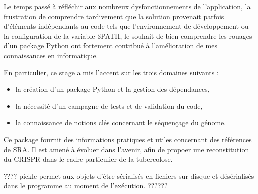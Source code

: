 \documentclass[twoside,a4paper,11pt,frenchb,openany]{report}
\begin{document}
Le temps passé à réfléchir aux nombreux dysfonctionnements de l'application, la frustration de comprendre tardivement que la solution provenait parfois d'éléments indépendants au code tels que l'environnement de développement ou la configuration de la variable \$PATH, le souhait de bien comprendre les rouages d'un package Python ont fortement contribué à l'amélioration de mes connaissances en informatique. 

En particulier, ce stage a mis l'accent sur les trois domaines suivants :
\begin{itemize}
\item la création d'un package Python et la gestion des dépendances,
\item la nécessité d'un campagne de tests et de validation du code,
\item la connaissance de notions clés concernant le séquençage du génome. 
\end{itemize}

Ce package fournit des informations pratiques et utiles concernant des références de SRA. Il est amené à évoluer dans l'avenir, afin de propoer une reconstitution du CRISPR dans le cadre particulier de la tubercolose.

	



????
pickle permet aux objets d'être sérialisés en fichiers sur disque et désérialisés dans le programme au moment de l'exécution.
??????
	


\printindex
\end{document}
